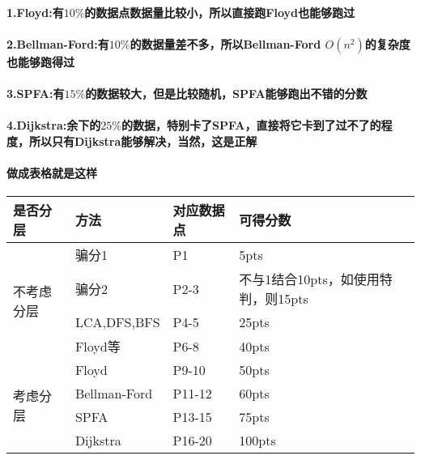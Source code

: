 \documentclass[final,11pt,oneside,UTF8]{report}
\begin{document}
\paragraph{1.Floyd:有$10\%$的数据点数据量比较小，所以直接跑Floyd也能够跑过}
\paragraph{2.Bellman-Ford:有$10\%$的数据量差不多，所以Bellman-Ford $O(n^2)$的复杂度也能够跑得过}
\paragraph{3.SPFA:有$15\%$的数据较大，但是比较随机，SPFA能够跑出不错的分数}
\paragraph{4.Dijkstra:余下的$25\%$的数据，特别卡了SPFA，直接将它卡到了过不了的程度，所以只有Dijkstra能够解决，当然，这是正解}
\paragraph{做成表格就是这样}
\begin{table}[H]
    \begin{tabular}{|l|l|l|l|}
        \hline
        是否分层                   & 方法           & 对应数据点  & 可得分数                    \\ \hline
        \multirow{4}{*}{不考虑分层} & 骗分1          & P1     & 5pts                    \\ \cline{2-4}
                               & 骗分2          & P2-3   & 不与1结合10pts，如使用特判，则15pts \\ \cline{2-4}
                               & LCA,DFS,BFS  & P4-5   & 25pts                   \\ \cline{2-4}
                               & Floyd等       & P6-8   & 40pts                   \\ \hline
        \multirow{4}{*}{考虑分层}  & Floyd        & P9-10  & 50pts                   \\ \cline{2-4}
                               & Bellman-Ford & P11-12 & 60pts                   \\ \cline{2-4}
                               & SPFA         & P13-15 & 75pts                   \\ \cline{2-4}
                               & Dijkstra     & P16-20 & 100pts                  \\ \hline
    \end{tabular}
\end{table}
\end{document}
